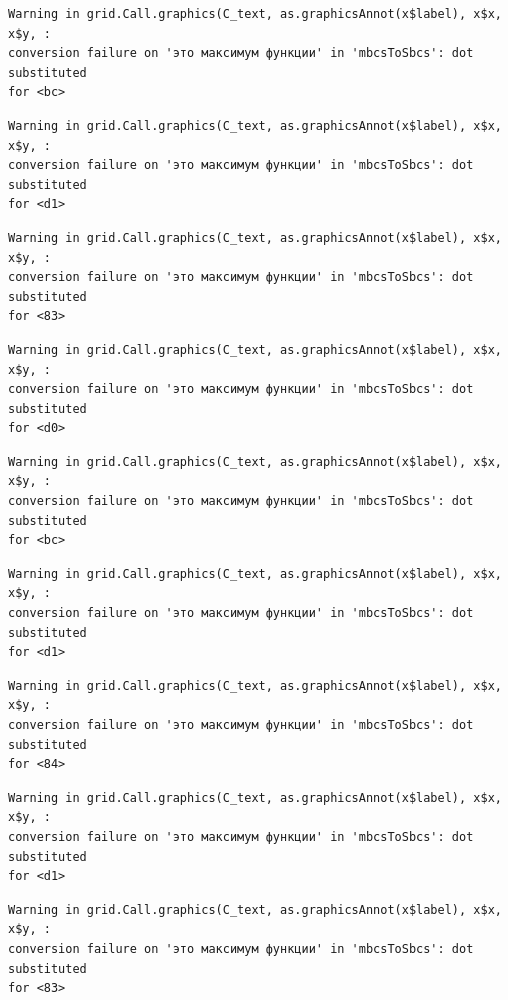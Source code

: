 \documentclass[
  letterpaper,
]{scrbook}
\theoremstyle{definition}
\theoremstyle{remark}
\begin{document}
\begin{verbatim}
Warning in grid.Call.graphics(C_text, as.graphicsAnnot(x$label), x$x, x$y, :
conversion failure on 'это максимум функции' in 'mbcsToSbcs': dot substituted
for <bc>
\end{verbatim}

\begin{verbatim}
Warning in grid.Call.graphics(C_text, as.graphicsAnnot(x$label), x$x, x$y, :
conversion failure on 'это максимум функции' in 'mbcsToSbcs': dot substituted
for <d1>
\end{verbatim}

\begin{verbatim}
Warning in grid.Call.graphics(C_text, as.graphicsAnnot(x$label), x$x, x$y, :
conversion failure on 'это максимум функции' in 'mbcsToSbcs': dot substituted
for <83>
\end{verbatim}

\begin{verbatim}
Warning in grid.Call.graphics(C_text, as.graphicsAnnot(x$label), x$x, x$y, :
conversion failure on 'это максимум функции' in 'mbcsToSbcs': dot substituted
for <d0>
\end{verbatim}

\begin{verbatim}
Warning in grid.Call.graphics(C_text, as.graphicsAnnot(x$label), x$x, x$y, :
conversion failure on 'это максимум функции' in 'mbcsToSbcs': dot substituted
for <bc>
\end{verbatim}

\begin{verbatim}
Warning in grid.Call.graphics(C_text, as.graphicsAnnot(x$label), x$x, x$y, :
conversion failure on 'это максимум функции' in 'mbcsToSbcs': dot substituted
for <d1>
\end{verbatim}

\begin{verbatim}
Warning in grid.Call.graphics(C_text, as.graphicsAnnot(x$label), x$x, x$y, :
conversion failure on 'это максимум функции' in 'mbcsToSbcs': dot substituted
for <84>
\end{verbatim}

\begin{verbatim}
Warning in grid.Call.graphics(C_text, as.graphicsAnnot(x$label), x$x, x$y, :
conversion failure on 'это максимум функции' in 'mbcsToSbcs': dot substituted
for <d1>
\end{verbatim}

\begin{verbatim}
Warning in grid.Call.graphics(C_text, as.graphicsAnnot(x$label), x$x, x$y, :
conversion failure on 'это максимум функции' in 'mbcsToSbcs': dot substituted
for <83>
\end{verbatim}
\end{document}
